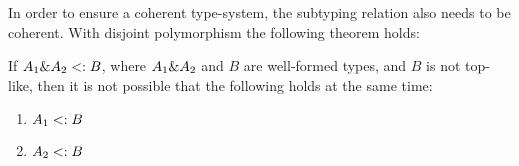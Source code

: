 %
%
%
%
%

In order to ensure a coherent type-system, the subtyping relation also
needs to be coherent. With disjoint polymorphism the following theorem holds:

\begin{lemma}
  \label{lemma:unique-subtype-contributor}

  If $A_1 \& A_2 <: B$, 
  where $A_1 \& A_2$ and $B$ are well-formed types, and
  $B$ is not top-like,
  then it is not possible that the following holds at the same time:
  \begin{enumerate}
    \item $A_1 <: B$
    \item $A_2 <: B$
  \end{enumerate}
\end{lemma}


